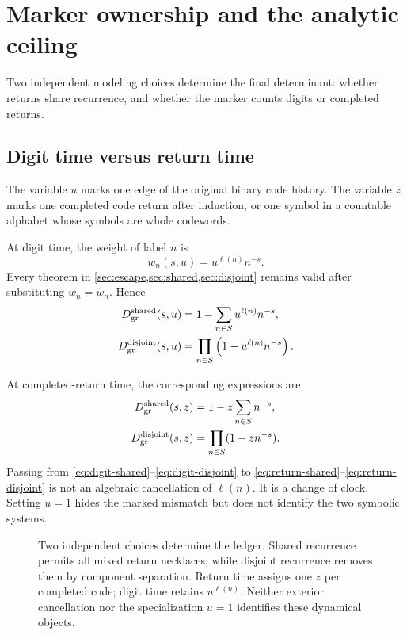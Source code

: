 \section{Marker ownership and the analytic ceiling}
\label{sec:ceiling}

Two independent modeling choices determine the final determinant: whether
returns share recurrence, and whether the marker counts digits or completed
returns.

\subsection{Digit time versus return time}

\begin{convention}
\label{conv:markers}
The variable \(u\) marks one edge of the original binary code history.  The
variable \(z\) marks one completed code return after induction, or one
symbol in a countable alphabet whose symbols are whole codewords.
\end{convention}

At digit time, the weight of label \(n\) is
\begin{equation}
        \widetilde w_n(s,u)=u^{\ell(n)}n^{-s}.
 \label{eq:digit-weight}
\end{equation}
Every theorem in \cref{sec:escape,sec:shared,sec:disjoint} remains valid
after substituting \(w_n=\widetilde w_n\).  Hence
\begin{align}
 D_{\mathrm{gr}}^{\rm shared}(s,u)
 &=1-\sum_{n\in S}u^{\ell(n)}n^{-s},
 \label{eq:digit-shared}\\
 D_{\mathrm{gr}}^{\rm disjoint}(s,u)
 &=\prod_{n\in S}\left(1-u^{\ell(n)}n^{-s}\right).
 \label{eq:digit-disjoint}
\end{align}

At completed-return time, the corresponding expressions are
\begin{align}
 D_{\mathrm{gr}}^{\rm shared}(s,z)
 &=1-z\sum_{n\in S}n^{-s},
 \label{eq:return-shared}\\
 D_{\mathrm{gr}}^{\rm disjoint}(s,z)
 &=\prod_{n\in S}(1-zn^{-s}).
 \label{eq:return-disjoint}
\end{align}
Passing from \eqref{eq:digit-shared}--\eqref{eq:digit-disjoint} to
\eqref{eq:return-shared}--\eqref{eq:return-disjoint} is not an algebraic
cancellation of \(\ell(n)\).  It is a change of clock.  Setting \(u=1\)
hides the marked mismatch but does not identify the two symbolic systems.

\begin{figure}[t]
  \centering
  \resizebox{0.96\textwidth}{!}{}
  \caption{Two independent choices determine the ledger.  Shared recurrence
  permits all mixed return necklaces, while disjoint recurrence removes them
  by component separation.  Return time assigns one \(z\) per completed
  code; digit time retains \(u^{\ell(n)}\).  Neither exterior cancellation
  nor the specialization \(u=1\) identifies these dynamical objects.}
  \label{fig:ownership}
\end{figure}

